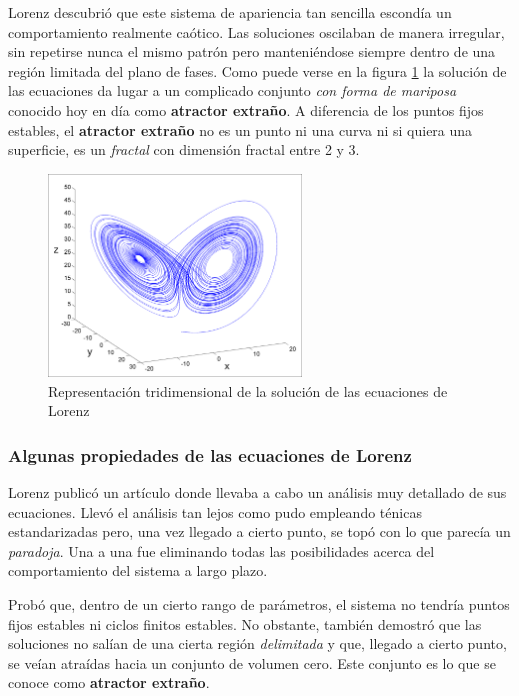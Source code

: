 Lorenz descubrió que este sistema de apariencia tan sencilla escondía un comportamiento realmente caótico. Las soluciones oscilaban de manera irregular, sin repetirse nunca el mismo patrón pero manteniéndose siempre dentro de una región limitada del plano de fases. Como puede verse en la figura \ref{fig:Lorenz} la solución de las ecuaciones da lugar a un complicado conjunto \emph{con forma de mariposa} conocido hoy en día como \textbf{atractor extraño}. A diferencia de los puntos fijos estables, el \textbf{atractor extraño} no es un punto ni una curva ni si quiera una superficie, es un \emph{fractal} con dimensión fractal entre 2 y 3.

\begin{figure}[hbtp]
\centering
\includegraphics[width = 0.6\textwidth]{img/Lorenz.png}
\caption{Representación tridimensional de la solución de las ecuaciones de Lorenz}
\label{fig:Lorenz}
\end{figure}

\subsubsection{Algunas propiedades de las ecuaciones de Lorenz}
Lorenz publicó un artículo donde llevaba a cabo un análisis muy detallado de sus ecuaciones. Llevó el análisis tan lejos como pudo empleando ténicas estandarizadas pero, una vez llegado a cierto punto, se topó con lo que parecía un \emph{paradoja}. Una a una fue eliminando todas las posibilidades acerca del comportamiento del sistema a largo plazo.

Probó que, dentro de un cierto rango de parámetros, el sistema no tendría puntos fijos estables ni ciclos finitos estables. No obstante, también demostró que las soluciones no salían de una cierta región \emph{delimitada} y que, llegado a cierto punto, se veían atraídas hacia un conjunto de volumen cero. Este conjunto es lo que se conoce como \textbf{atractor extraño}.

